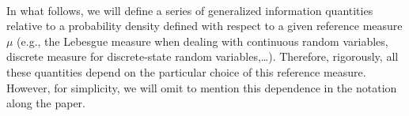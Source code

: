 \documentclass[english,sort&compress]{elsarticle}
\theoremstyle{definition}
\theoremstyle{plain}
\theoremstyle{plain}
\newcommand{\Esp}[1]{\mathbb{E}\left[ #1 \right]}
\begin{document}

\

In what follows, we will define a series of generalized information quantities
relative to a probability density defined with respect to a given reference
measure $\mu$ (e.g., the Lebesgue measure when dealing with continuous random
variables, discrete measure for discrete-state random variables,\ldots).
Therefore, rigorously, all these quantities depend on the particular choice of
this reference measure. However, for simplicity, we will omit to mention
this dependence in the notation along the paper.

\end{document}
